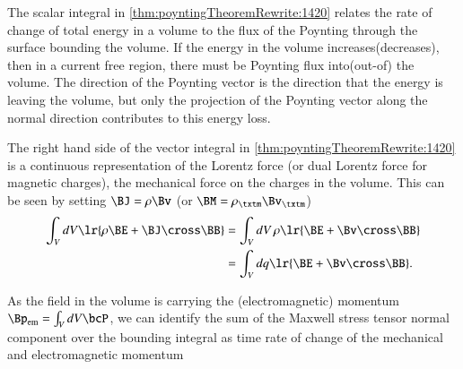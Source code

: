 The scalar integral in \cref{thm:poyntingTheoremRewrite:1420}
relates the rate of change of total energy in a volume to the flux of the Poynting through the surface bounding the volume.
If the energy in the volume increases(decreases), then in a current free region, there must be Poynting flux into(out-of) the volume.
The direction of the Poynting vector is the direction that the energy is leaving the volume, but only the projection of the Poynting vector along the normal direction contributes to this energy loss.

The right hand side of the vector integral in \cref{thm:poyntingTheoremRewrite:1420} is a continuous representation of the Lorentz force
(or dual Lorentz force for magnetic charges),
the mechanical force on the charges in the volume.  This can be seen by setting \( \BJ = \rho \Bv \) (or \( \BM = \rho_\txtm \Bv_\txtm \))
\begin{equation}\label{eqn:poyntingTheoremRewrite:1420}
\begin{aligned}
\int_V dV \lr{ \rho \BE + \BJ \cross \BB }
&= \int_V dV\, \rho \lr{ \BE + \Bv \cross \BB } \\
&= \int_V dq \lr{ \BE + \Bv \cross \BB }.
\end{aligned}
\end{equation}

As the field in the volume is carrying the (electromagnetic) momentum \( \Bp_{\textrm{em}} = \int_V dV \bcP \), we can identify the sum of the Maxwell stress tensor normal component over the bounding integral as time rate of change of the mechanical and electromagnetic momentum

